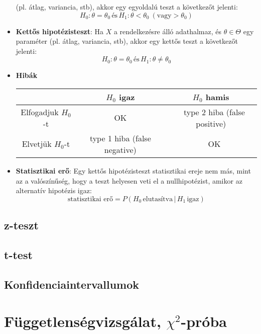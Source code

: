 \documentclass[12pt]{article}
\theoremstyle{plain}
\begin{document}
\begin{itemize}
    (pl. átlag, variancia, stb), akkor egy egyoldalú teszt a következőt jelenti:
    \begin{equation*}
        H_0: \theta = \theta_0 \,\text{és}\, H_1: \theta < \theta_0 ~ (\text{vagy} > \theta_0) 
    \end{equation*}
    \item \textbf{Kettős hipotézisteszt}: Ha $X$ a rendelkezésre álló adathalmaz, és $\theta\in \Theta$ egy paraméter 
    (pl. átlag, variancia, stb), akkor egy kettős teszt a következőt jelenti:
    \begin{equation*}
        H_0: \theta = \theta_0 \,\text{és}\, H_1: \theta \neq\theta_0 
    \end{equation*}
    \item \textbf{Hibák}
    \begin{center}
        \begin{tabular}[H]{|c|c|c|} \hline
                            & $H_0$ igaz & $H_0$ hamis \\ \hline
        Elfogadjuk $H_0$-t  &      OK   &   type 2 hiba (false positive)  \\ \hline
        Elvetjük $H_0$-t    & type 1 hiba (false negative)  &      OK     \\ \hline
        \end{tabular}
    \end{center}
    \item \textbf{Statisztikai erő}: Egy kettős hipotézisteszt statisztikai ereje nem más, mint az a valószínűség,
    hogy a teszt helyesen veti el a nullhipotézist, amikor az alternatív hipotézis igaz:
    \begin{equation*}
        \text{statisztikai erő} = P(H_0 \,\text{elutasítva} \,|\, H_1 \,\text{igaz})
    \end{equation*}
    
\end{itemize}
\subsection{z-teszt}
\subsection{t-test}
\subsection{Konfidenciaintervallumok}

\section{Függetlenségvizsgálat, $\chi^2$-próba}



\end{document}
